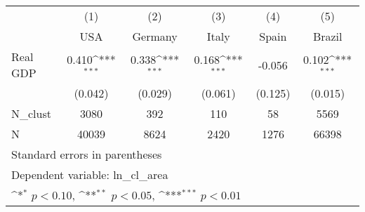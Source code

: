{
\def\sym#1{\ifmmode^{#1}\else\(^{#1}\)\fi}
\begin{tabular}{l*{5}{c}}
\hline\hline
            &\multicolumn{1}{c}{(1)}&\multicolumn{1}{c}{(2)}&\multicolumn{1}{c}{(3)}&\multicolumn{1}{c}{(4)}&\multicolumn{1}{c}{(5)}\\
            &\multicolumn{1}{c}{USA}&\multicolumn{1}{c}{Germany}&\multicolumn{1}{c}{Italy}&\multicolumn{1}{c}{Spain}&\multicolumn{1}{c}{Brazil}\\
\hline
Real GDP    &       0.410\sym{***}&       0.338\sym{***}&       0.168\sym{***}&      -0.056         &       0.102\sym{***}\\
            &     (0.042)         &     (0.029)         &     (0.061)         &     (0.125)         &     (0.015)         \\
\hline
N\_clust     &        3080         &         392         &         110         &          58         &        5569         \\
N           &       40039         &        8624         &        2420         &        1276         &       66398         \\
\hline\hline
\multicolumn{6}{l}{\footnotesize Standard errors in parentheses}\\
\multicolumn{6}{l}{\footnotesize Dependent variable: ln\_cl\_area}\\
\multicolumn{6}{l}{\footnotesize \sym{*} \(p<0.10\), \sym{**} \(p<0.05\), \sym{***} \(p<0.01\)}\\
\end{tabular}
}
